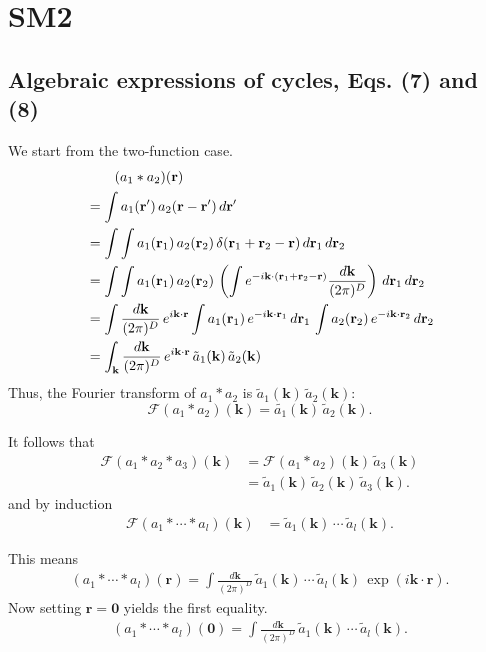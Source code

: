 \documentclass[preprint]{revtex4-1}
\numberwithin{equation}{subsection}
\numberwithin{table}{section}
\newcommand{\vct}[1]{\mathbf{#1}}
\providecommand{\vr}{} %
\renewcommand{\vr}{\vct{r}}
\newcommand{\vk}{\vct{k}}
\newcommand{\dvk}{\frac{d\vk}{(2\pi)^D}}
\newcommand{\FT}{\mathscr{F}}
\begin{document}
\section{SM2}





\subsection{Algebraic expressions of cycles, Eqs. (7) and (8)}



We start from the two-function case.
%
\begin{align}
& \hphantom{=\int} (a_1 * a_2)(\vr)
\notag \\
&=
  \int
    a_1(\vr') \,
    a_2(\vr - \vr') \, d\vr'
\notag \\
&=
  \int \int
    a_1(\vr_1) \,
    a_2(\vr_2) \,
    \delta(\vr_1 + \vr_2 - \vr) \,
    d\vr_1 \, d\vr_2
\notag \\
&=
  \int \int
    a_1(\vr_1) \,
    a_2(\vr_2) \,
    \left( \int e^{-i \vk \cdot (\vr_1 + \vr_2 - \vr)} \dvk \right) \,
    d\vr_1 \, d\vr_2
\notag \\
&=
  \int
  \dvk \,
  e^{i \vk \cdot \vr}
  \int
    a_1(\vr_1) \, e^{-i \vk \cdot \vr_1} \,
    d\vr_1 \,
  \int
    a_2(\vr_2) \, e^{-i \vk \cdot \vr_2} \,
    d\vr_2
\notag \\
&=
  \int_\vk \dvk \,
  e^{i\vk \cdot \vr} \,
  \tilde{a}_1(\vk) \,
  \tilde{a}_2(\vk) \,
  \label{eq:convol}
\end{align}
Thus, the Fourier transform of $a_1 * a_2$ is
$\tilde{a}_1(\vk) \, \tilde{a}_2(\vk)$:
\[
  \FT(a_1 * a_2)(\vk) = \tilde{a_1}(\vk) \, \tilde{a}_2(\vk).
\]

It follows that
\begin{align*}
  \FT(a_1 * a_2 * a_3)(\vk)
&= \FT(a_1 * a_2)(\vk) \, \tilde{a}_3(\vk)
  \\
&= \tilde{a}_1(\vk) \, \tilde{a}_2(\vk) \, \tilde{a}_3(\vk).
\end{align*}
and by induction
\begin{align*}
  \FT(a_1 * \cdots * a_l)(\vk)
&= \tilde{a}_1(\vk) \, \cdots \, \tilde{a}_l(\vk).
\end{align*}

This means
\begin{align*}
  (a_1 * \cdots * a_l)(\vr)
= \int \dvk \, \tilde{a}_1(\vk) \, \cdots \, \tilde{a}_l(\vk)
  \, \exp(i\vk\cdot\vr).
\end{align*}
%
Now setting $\vr = \vct 0$ yields the first equality.
\begin{align*}
  (a_1 * \cdots * a_l)(\vct 0)
= \int \dvk \, \tilde{a}_1(\vk) \, \cdots \, \tilde{a}_l(\vk).
\end{align*}
\end{document}
